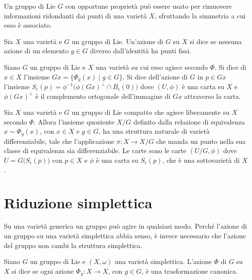 Un gruppo di Lie $G$ con opportune proprietà può essere usato per rimuovere informazioni ridondanti dai punti di una varietà $X$, sfruttando la simmetria a cui esso è associato.
\begin{definition}
  Sia $X$ una varietà e $G$ un gruppo di Lie. Un'azione di $G$ su $X$ si dice  se nessuna azione di un elemento $g \in G$ diverso dall'identità ha punti fissi.
\end{definition}
\begin{definition}
  Siano $G$ un gruppo di Lie e $X$ una varietà su cui esso agisce secondo $\Phi$. Si dice  di $x \in X$ l'insieme $Gx = \{ \Phi_g(x)\mid g \in G\}$. Si dice  dell'azione di $G$ in $p \in Gx$ l'insieme $S_{\epsilon}(p) = \phi^{-1}\big(\phi(Gx)^{\perp} \cap B_{\epsilon}(0)\big)$ dove $(U,\phi)$ è una carta su $X$ e $\phi(Gx)^{\perp}$ è il complemento ortogonale dell'immagine di $Gx$ attraverso la carta.
\end{definition}
\begin{theorem}
  Sia $X$ una varietà e $G$ un gruppo di Lie compatto che agisce liberamente su $X$ secondo $\Phi$. Allora l'insieme quoziente $X/G$ definito dalla relazione di equivalenza $x \sim \Phi_g(x)$, con $x \in X$ e $g \in G$, ha una struttura naturale di varietà differenziabile, tale che l'applicazione $\pi:X \to X /G$ che manda un punto nella sua classe di equivalenza sia differenziabile. Le carte sono le carte $(U/G,\phi)$ dove $U = G\big(S_{\epsilon}(p)\big)$ con $p \in X$ e $\phi$ è una carta su $S_{\epsilon}(p)$, che è una sottovarietà di $X$.
\end{theorem}

\section{Riduzione simplettica}
Su una varietà generica un gruppo può agire in qualsiasi modo. Perché l'azione di un gruppo su una varietà simplettica abbia senso, è invece necessario che l'azione del gruppo non cambi la struttura simplettica.
\begin{definition}
  Siano $G$ un gruppo di Lie e $(X, \omega)$ una varietà simplettica. L'azione $\Phi$ di $G$ su $X$ si dice  se ogni azione $\Phi_g:X\to X$, con $g \in G$, è una trasformazione canonica.
\end{definition}

